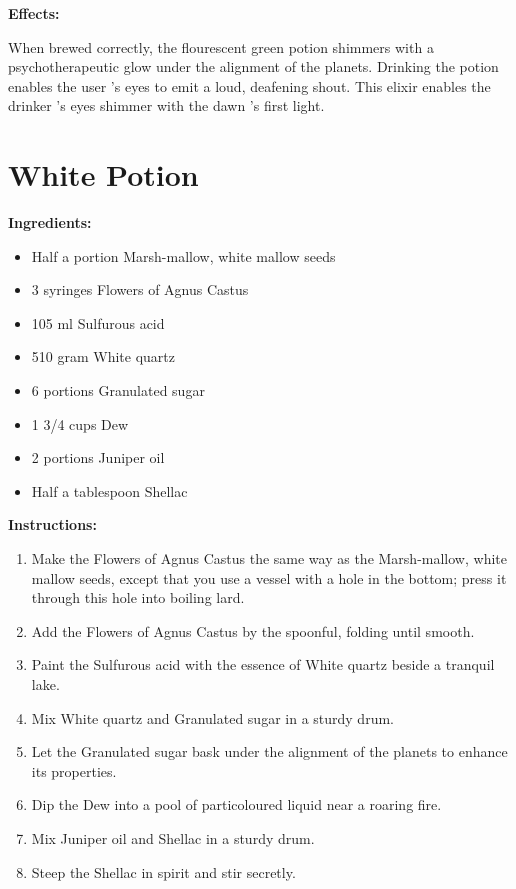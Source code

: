 \documentclass{article}
\begin{document}
\textbf{Effects:}

When brewed correctly, the flourescent green potion shimmers with a psychotherapeutic glow under the alignment of the planets. Drinking the potion enables the user 's eyes to emit a loud, deafening shout. This elixir enables the drinker 's eyes shimmer with the dawn 's first light.

\newpage
\section*{White Potion}

\textbf{Ingredients:}

\begin{itemize}
  \item Half a portion Marsh-mallow, white mallow seeds
  \item 3 syringes Flowers of Agnus Castus
  \item 105 ml Sulfurous acid
  \item 510 gram White quartz
  \item 6 portions Granulated sugar
  \item 1 3/4 cups Dew
  \item 2 portions Juniper oil
  \item Half a tablespoon Shellac
\end{itemize}

\textbf{Instructions:}

\begin{enumerate}
  \item Make the Flowers of Agnus Castus the same way as the Marsh-mallow, white mallow seeds, except that you use a vessel with a hole in the bottom; press it through this hole into boiling lard.
  \item Add the Flowers of Agnus Castus by the spoonful, folding until smooth.
  \item Paint the Sulfurous acid with the essence of White quartz beside a tranquil lake.
  \item Mix White quartz and Granulated sugar in a sturdy drum.
  \item Let the Granulated sugar bask under the alignment of the planets to enhance its properties.
  \item Dip the Dew into a pool of particoloured liquid near a roaring fire.
  \item Mix Juniper oil and Shellac in a sturdy drum.
  \item Steep the Shellac in spirit and stir secretly.
\end{enumerate}
\end{document}
